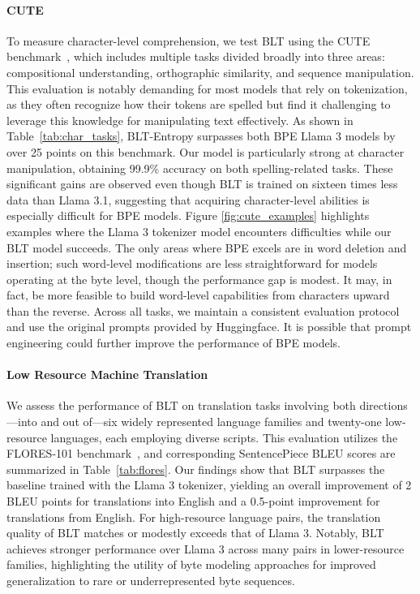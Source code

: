 \paragraph{CUTE}
To measure character-level comprehension, we test {\textsc BLT} using the CUTE benchmark~\citep{edman2024cute}, which includes multiple tasks divided broadly into three areas: compositional understanding, orthographic similarity, and sequence manipulation. This evaluation is notably demanding for most models that rely on tokenization, as they often recognize how their tokens are spelled but find it challenging to leverage this knowledge for manipulating text effectively. As shown in Table~\ref{tab:char_tasks}, {\textsc BLT}-Entropy surpasses both BPE Llama 3 models by over 25 points on this benchmark. Our model is particularly strong at character manipulation, obtaining 99.9\% accuracy on both spelling-related tasks. These significant gains are observed even though {\textsc BLT} is trained on sixteen times less data than Llama 3.1, suggesting that acquiring character-level abilities is especially difficult for BPE models. Figure \ref{fig:cute_examples} highlights examples where the Llama 3 tokenizer model encounters difficulties while our {\textsc BLT} model succeeds. The only areas where BPE excels are in word deletion and insertion; such word-level modifications are less straightforward for models operating at the byte level, though the performance gap is modest. It may, in fact, be more feasible to build word-level capabilities from characters upward than the reverse. Across all tasks, we maintain a consistent evaluation protocol and use the original prompts provided by Huggingface. It is possible that prompt engineering could further improve the performance of BPE models.

\paragraph{Low Resource Machine Translation} We assess the performance of {\textsc BLT} on translation tasks involving both directions—into and out of—six widely represented language families and twenty-one low-resource languages, each employing diverse scripts. This evaluation utilizes the FLORES-101 benchmark~\citep{goyal2022flores}, and corresponding SentencePiece BLEU scores are summarized in Table~\ref{tab:flores}. Our findings show that {\textsc BLT} surpasses the baseline trained with the Llama 3 tokenizer, yielding an overall improvement of 2 BLEU points for translations into English and a 0.5-point improvement for translations from English. For high-resource language pairs, the translation quality of {\textsc BLT} matches or modestly exceeds that of Llama 3. Notably, {\textsc BLT} achieves stronger performance over Llama 3 across many pairs in lower-resource families, highlighting the utility of byte modeling approaches for improved generalization to rare or underrepresented byte sequences.

